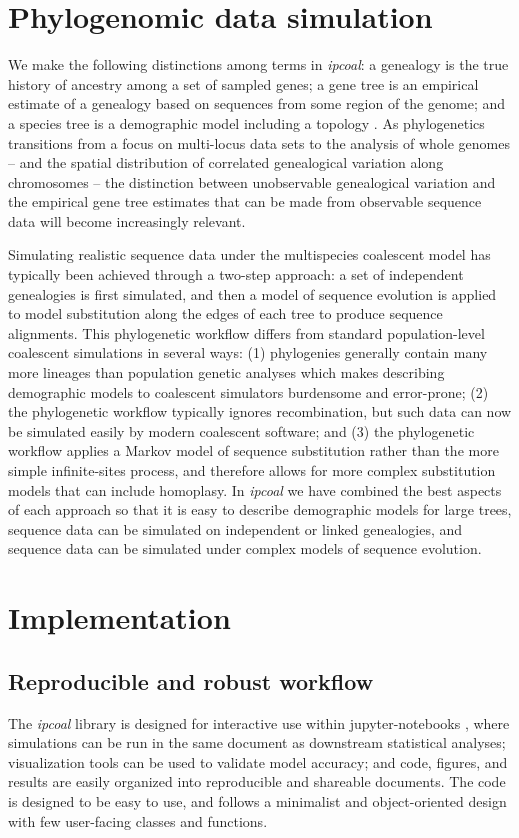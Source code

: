 \documentclass[11pt]{article}
\begin{document}
\section{Phylogenomic data simulation}
We make the following distinctions among terms in \emph{ipcoal}: a genealogy is the true history of ancestry among a set of sampled genes; a gene tree is an empirical estimate of a genealogy based on sequences from some region of the genome; and a species tree is a demographic model including a topology \citep{pamilo_relationships_1988,maddison_gene_1997}. As phylogenetics transitions from a focus on multi-locus data sets \citep{knowles_estimating_2011} to the analysis of whole genomes -- and the spatial distribution of correlated genealogical variation along chromosomes -- the distinction between unobservable genealogical variation and the empirical gene tree estimates that can be made from observable sequence data will become increasingly relevant. 

Simulating realistic sequence data under the multispecies coalescent model has typically been achieved through a two-step approach: a set of independent genealogies is first simulated, and then a model of sequence evolution is applied to model substitution along the edges of each tree to produce sequence alignments. This phylogenetic workflow differs from standard population-level coalescent simulations in several ways: (1) phylogenies generally contain many more lineages than population genetic analyses which makes describing demographic models to coalescent simulators burdensome and error-prone; (2) the phylogenetic workflow typically ignores recombination, but such data can now be simulated easily by modern coalescent software; and (3) the phylogenetic workflow applies a Markov model of sequence substitution rather than the more simple infinite-sites process, and therefore allows for more complex substitution models that can include homoplasy. In \emph{ipcoal} we have combined the best aspects of each approach so that it is easy to describe demographic models for large trees, sequence data can be simulated on independent or linked genealogies, and sequence data can be simulated under complex models of sequence evolution. 

\section{Implementation}
\label{sec:headings}
\subsection{Reproducible and robust workflow}
The \emph{ipcoal} library is designed for interactive use within jupyter-notebooks \citep{kluyver_jupyter_2016}, where simulations can be run in the same document as downstream statistical analyses; visualization tools can be used to validate model accuracy; and code, figures, and results are easily organized into reproducible and shareable documents. The code is designed to be easy to use, and follows a minimalist and object-oriented design with few user-facing classes and functions.
\end{document}
